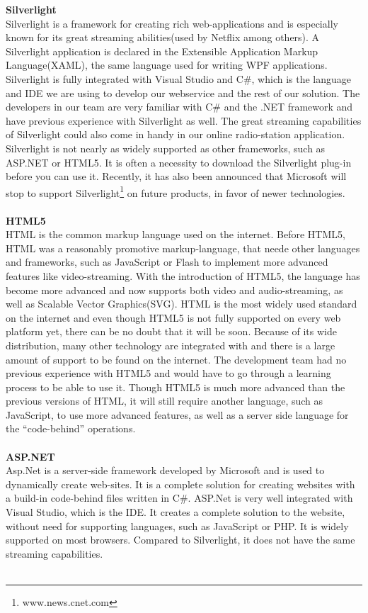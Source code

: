 \documentclass[a4paper,11pt,report]{article}
\begin{document}
\textbf{Silverlight} \\
Silverlight is a framework for creating rich web-applications and is especially known for its great streaming abilities(used by Netflix\cite{netflix} among others). A Silverlight application is declared in the Extensible Application Markup Language(XAML), the same language used for writing WPF applications.  Silverlight is fully integrated with Visual Studio and C\#, which is the language and IDE we are using to develop our webservice and the rest of our solution. The developers in our team are very familiar with C\# and the .NET framework and have previous experience with Silverlight as well. The great streaming capabilities of Silverlight could also come in handy in our online radio-station application. Silverlight is not nearly as widely supported as other frameworks, such as ASP.NET or HTML5. It is often a necessity to download the Silverlight plug-in before you can use it. Recently, it has also been announced that Microsoft will stop to support Silverlight\footnote{www.news.cnet.com} on future products, in favor of newer technologies. \\ \\

\textbf{HTML5} \\
HTML is the common markup language used on the internet. Before HTML5, HTML was a reasonably promotive markup-language, that neede other languages and frameworks, such as JavaScript or Flash to implement more advanced features like video-streaming. With the introduction of HTML5, the language has become more advanced and now supports both video and audio-streaming, as well as Scalable Vector Graphics(SVG). HTML is the most widely used standard on the internet and even though HTML5 is not fully supported on every web platform yet, there can be no doubt that it will be soon. Because of its wide distribution, many other technology are integrated with and there is a large amount of support to be found on the internet. The development team had no previous experience with HTML5 and would have to go through a learning process to be able to use it. Though HTML5 is much more advanced than the previous versions of HTML, it will still require another language, such as JavaScript, to use more advanced features, as well as a server side language for the “code-behind” operations. \\ \\

\textbf{ASP.NET} \\
Asp.Net is a server-side framework developed by Microsoft and is used to dynamically create web-sites. It is a complete solution for creating websites with a build-in code-behind files written in C\#. ASP.Net is very well integrated with Visual Studio, which is the IDE. It creates a complete solution to the website, without need for supporting languages, such as JavaScript or PHP. It is widely supported on most browsers. Compared to Silverlight, it does not have the same streaming capabilities. \\ \\
\end{document}
